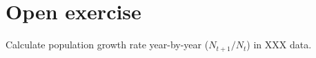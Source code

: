 \documentclass[10pt]{beamer}\usepackage[]{graphicx}\usepackage[]{color}
\begin{document}
\section{Open exercise}

\begin{frame}
  Calculate population growth rate year-by-year ($ N_{t+1}/N_{t}$) in XXX data.
  
  
  
\end{frame}
\end{document}
